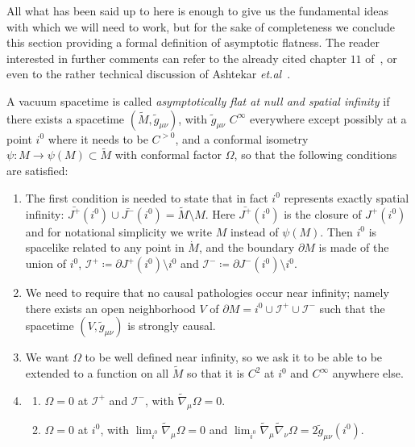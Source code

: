 All what has been said up to here is enough to give us the fundamental ideas with which we will need to work, but for the sake of completeness we conclude this section providing a formal definition of asymptotic flatness. The reader interested in further comments can refer to the already cited chapter \(11\) of~\cite{wald2010general}, or even to the rather technical discussion of Ashtekar \emph{et.al}~\cite{ashtekar1978unified}.
\begin{definition}
	A vacuum spacetime is called \emph{asymptotically flat at null and spatial infinity} if there exists a spacetime \((\tilde{M}, \tilde{g}_{\mu\nu})\), with \(\tilde{g}_{\mu\nu}\) \(C^{\infty}\) everywhere except possibly at a point \(i^0\) where it needs to be \(C^{>0}\), and a conformal isometry \(\psi: M \rightarrow \psi(M)\subset \tilde{M}\) with conformal factor \(\Omega\), so that the following conditions are satisfied:
	\begin{enumerate}[label=(\arabic*)]
		\item The first condition is needed to state that in fact \(i^0\) represents exactly spatial infinity: \(\bar{J^+}(i^0) \cup \bar{J^-}(i^0) = \tilde{M} \setminus M\). Here \(\bar{J^+}(i^0)\) is the closure of \(J^+(i^0)\) and for notational simplicity we write \(M\) instead of \(\psi(M)\). Then \(i^0\) is spacelike related to any point in \(\dot{M}\), and the boundary \(\partial M\) is made of the union  of \(i^0\), \(\mathscr{I}^+ \coloneqq \partial J^+(i^0) \setminus i^0\) and \(\mathscr{I}^- \coloneqq \partial J^-(i^0) \setminus i^0\).
		\item We need to require that no causal pathologies occur near infinity; namely there exists an open neighborhood \(V\) of \(\partial M = i^0 \cup \mathscr{I}^+ \cup \mathscr{I}^-\) such that the spacetime \((V, \tilde{g}_{\mu\nu})\) is strongly causal.
		\item We want \(\Omega\) to be well defined near infinity, so we ask it to be able to be extended to a function on all \(\tilde{M}\) so that it is \(C^2\) at \(i^0\) and \(C^{\infty}\) anywhere else.
		\item \begin{enumerate}
			\item \(\Omega = 0\) at \(\mathscr{I}^+\) and \(\mathscr{I}^-\), with \(\tilde{\nabla}_{\mu} \Omega = 0\).
			\item \(\Omega = 0\) at \(i^0\), with \(\lim_{i^0} \tilde{\nabla}_{\mu} \Omega = 0\) and \(\lim_{i^0} \tilde{\nabla}_{\mu} \tilde{\nabla}_{\nu}\Omega = 2\tilde{g}_{\mu\nu}(i^0)\).

\end{enumerate}
\end{enumerate}
\end{definition}
